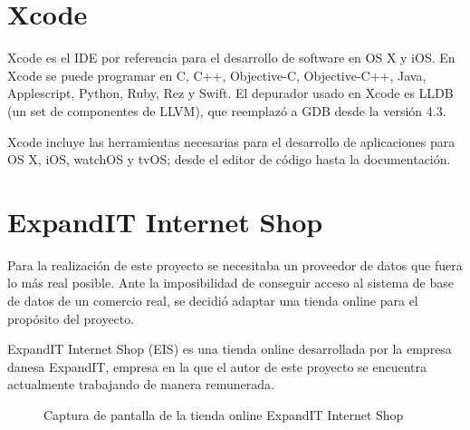 \section{Xcode}
Xcode es el IDE por referencia para el desarrollo de software en OS X y iOS. En Xcode se puede programar en C, C++, Objective-C, Objective-C++, Java, Applescript, Python, Ruby, Rez y Swift. El depurador usado en Xcode es LLDB (un set de componentes de LLVM), que reemplazó a GDB desde la versión 4.3.

Xcode incluye las herramientas necesarias para el desarrollo de aplicaciones para OS X, iOS, watchOS y tvOS; desde el editor de código hasta la documentación.

\section{ExpandIT Internet Shop}
Para la realización de este proyecto se necesitaba un proveedor de datos que fuera lo más real posible. Ante la imposibilidad de conseguir acceso al sistema de base de datos de un comercio real, se decidió adaptar una tienda online para el propósito del proyecto.

ExpandIT Internet Shop \cite{EIS} (EIS) es una tienda online desarrollada por la empresa danesa ExpandIT, empresa en la que el autor de este proyecto se encuentra actualmente trabajando de manera remunerada.

\begin{figure}[h]
	\centering
	\caption{Captura de pantalla de la tienda online ExpandIT Internet Shop}
\end{figure}

